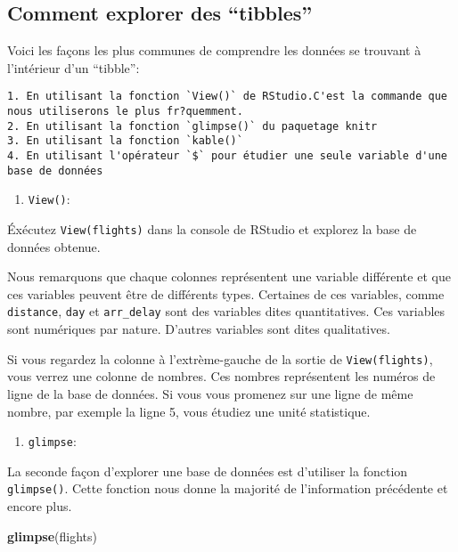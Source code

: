 \documentclass[]{book}
\newenvironment{Shaded}{\begin{snugshade}}{\end{snugshade}}
\newcommand{\KeywordTok}[1]{\textcolor[rgb]{0.13,0.29,0.53}{\textbf{#1}}}
\newcommand{\NormalTok}[1]{#1}
\providecommand{\tightlist}{%
  \setlength{\itemsep}{0pt}\setlength{\parskip}{0pt}}
\begin{document}
\subsection{\texorpdfstring{Comment explorer des
``tibbles''}{Comment explorer des tibbles}}\label{explorertibbles}

Voici les façons les plus communes de comprendre les données se trouvant
à l'intérieur d'un ``tibble'':

\begin{verbatim}
1. En utilisant la fonction `View()` de RStudio.C'est la commande que nous utiliserons le plus fr?quemment.
2. En utilisant la fonction `glimpse()` du paquetage knitr
3. En utilisant la fonction `kable()`
4. En utilisant l'opérateur `$` pour étudier une seule variable d'une base de données
\end{verbatim}

\begin{enumerate}
\def\labelenumi{\arabic{enumi}.}
\tightlist
\item
  \texttt{View()}:
\end{enumerate}

Éxécutez \texttt{View(flights)} dans la console de RStudio et explorez
la base de données obtenue.

Nous remarquons que chaque colonnes représentent une variable différente
et que ces variables peuvent être de différents types. Certaines de ces
variables, comme \texttt{distance}, \texttt{day} et \texttt{arr\_delay}
sont des variables dites quantitatives. Ces variables sont numériques
par nature. D'autres variables sont dites qualitatives.

Si vous regardez la colonne à l'extrème-gauche de la sortie de
\texttt{View(flights)}, vous verrez une colonne de nombres. Ces nombres
représentent les numéros de ligne de la base de données. Si vous vous
promenez sur une ligne de même nombre, par exemple la ligne 5, vous
étudiez une unité statistique.

\begin{enumerate}
\def\labelenumi{\arabic{enumi}.}
\setcounter{enumi}{1}
\tightlist
\item
  \texttt{glimpse}:
\end{enumerate}

La seconde façon d'explorer une base de données est d'utiliser la
fonction \texttt{glimpse()}. Cette fonction nous donne la majorité de
l'information précédente et encore plus.

\begin{Shaded}
\begin{Highlighting}[]
\KeywordTok{glimpse}\NormalTok{(flights)}
\end{Highlighting}
\end{Shaded}
\end{document}
